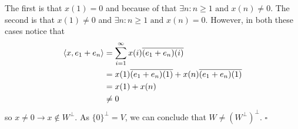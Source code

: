 \documentclass[12pt]{article}
\begin{document}
\begin{enumerate}
\begin{enumerate}
\begin{enumerate}
                                    The first is that $x(1)=0$ and because of that $\exists n: n \ge 1 \text{ and }x(n) \ne 0$.
                                    The second is that $x(1) \ne 0$ and $\exists n: n \ge 1\text{ and }x(n)=0$.
                                    However, in both these cases notice that
                                    \begin{align*}
                                          \braket{x, e_1+e_n} & = \sum_{i=1}^{\infty} x(i)\overline{(e_1+e_n)(i)}         \\
                                                              & = x(1)\overline{(e_1+e_n)(1)}+x(n)\overline{(e_1+e_n)(1)} \\
                                                              & = x(1)+x(n)                                               \\
                                                              & \ne 0
                                    \end{align*}
                                    so $x \ne 0 \rightarrow x \notin W^\perp$.
                                    As $\{0\}^\perp=V$, we can conclude that $W \ne (W^\perp)^\perp$. $\square$
                        \end{enumerate}
            \end{enumerate}
\end{enumerate}
\end{document}
